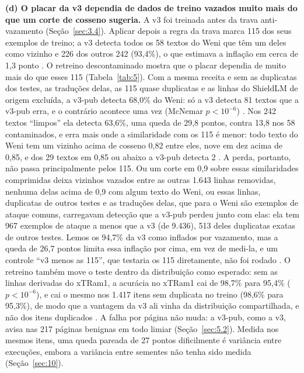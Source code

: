 \documentclass[11pt]{article}
\begin{document}
\textbf{(d) O placar da v3 dependia de dados de treino vazados muito mais do que um corte de cosseno sugeria.} A v3 foi treinada antes da trava anti-vazamento (Seção~\ref{sec:3.4}). Aplicar depois a regra da trava marca 115 dos seus exemplos de treino; a v3 detecta todos os 58 textos do Weni que têm um deles como vizinho e 226 dos outros 242 (93,4\%), o que estimava a inflação em cerca de 1,3 ponto%
. O retreino descontaminado mostra que o placar dependia de muito mais do que esses 115 (Tabela~\ref{tab:5}). Com a mesma receita e sem as duplicatas dos testes, as traduções delas, as 115 quase duplicatas e as linhas do ShieldLM de origem excluída, a v3-pub detecta 68,0\% do Weni: só a v3 detecta 81 textos que a v3-pub erra, e o contrário acontece uma vez (McNemar $p<10^{-6}$)%
. Nos 242 textos ``limpos'' ela detecta 63,6\%, uma queda de 29,8 pontos, contra 13,8 nos 58 contaminados, e erra mais onde a similaridade com os 115 é menor: todo texto do Weni tem um vizinho acima de cosseno 0,82 entre eles, nove em dez acima de 0,85, e dos 29 textos em 0,85 ou abaixo a v3-pub detecta 2%
. A perda, portanto, não passa principalmente pelos 115. Ou um corte em 0,9 sobre essas similaridades comprimidas deixa vizinhos vazados entre as outras 1.643 linhas removidas, nenhuma delas acima de 0,9 com algum texto do Weni, ou essas linhas, duplicatas de outros testes e as traduções delas, que para o Weni são exemplos de ataque comuns, carregavam detecção que a v3-pub perdeu junto com elas: ela tem 967 exemplos de ataque a menos que a v3 (de 9.436), 513 deles duplicatas exatas de outros testes. Lemos os 94,7\% da v3 como inflados por vazamento, mas a queda de 26,7 pontos limita essa inflação por cima, em vez de medi-la, e um controle ``v3 menos as 115'', que testaria os 115 diretamente, não foi rodado%
. O retreino também move o teste dentro da distribuição como esperado: sem as linhas derivadas do xTRam1, a acurácia no xTRam1 cai de 98,7\% para 95,4\% ($p<10^{-6}$), e cai o mesmo nos 1.417 itens sem duplicata no treino (98,6\% para 95,3\%), de modo que a vantagem da v3 ali vinha da distribuição compartilhada, e não dos itens duplicados%
. A falha por página não muda: a v3-pub, como a v3, avisa nas 217 páginas benignas em todo limiar (Seção~\ref{sec:5.2}). Medida nos mesmos itens, uma queda pareada de 27 pontos dificilmente é variância entre execuções, embora a variância entre sementes não tenha sido medida (Seção~\ref{sec:10}).
\end{document}
